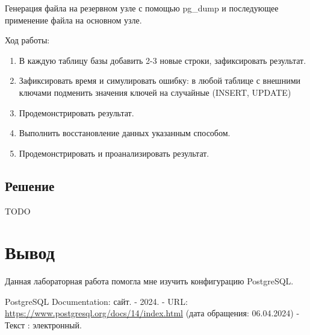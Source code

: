 \documentclass{article}
\begin{document}
Генерация файла на резервном узле с помощью pg\_dump и последующее применение файла на основном узле.

Ход работы:

\begin{enumerate}
    \item В каждую таблицу базы добавить 2-3 новые строки, зафиксировать результат.
    \item Зафиксировать время и симулировать ошибку: в любой таблице с внешними ключами подменить значения ключей на случайные (INSERT, UPDATE)
    \item Продемонстрировать результат.
    \item Выполнить восстановление данных указанным способом.
    \item Продемонстрировать и проанализировать результат.
\end{enumerate}

\subsection{Решение}

TODO

\section{Вывод}

Данная лабораторная работа помогла мне изучить конфигурацию PostgreSQL.

\begin{thebibliography}{99}
    PostgreSQL Documentation: сайт. - 2024.
    - URL: \url{https://www.postgresql.org/docs/14/index.html} (дата обращения: 06.04.2024) - Текст : электронный.
\end{thebibliography}
\end{document}
